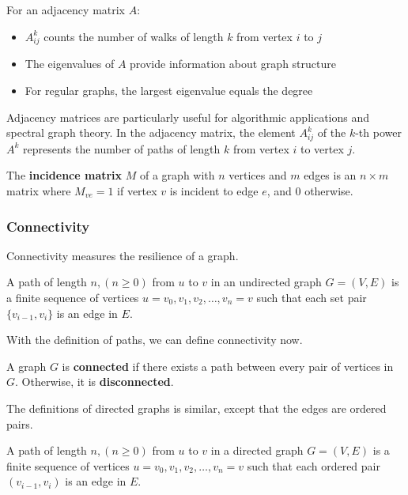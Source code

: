 \begin{theorem}
For an adjacency matrix $A$:
\begin{itemize}
    \item $A^k_{ij}$ counts the number of walks of length $k$ from vertex $i$ to $j$
    \item The eigenvalues of $A$ provide information about graph structure
    \item For regular graphs, the largest eigenvalue equals the degree
\end{itemize}
\end{theorem}

Adjacency matrices are particularly useful for algorithmic applications and spectral graph theory. In the adjacency matrix, the element $A^k_{ij}$ of the $k$-th power $A^k$ represents the number of paths of length $k$ from vertex $i$ to vertex $j$.

\begin{definition}
The \textbf{incidence matrix} $M$ of a graph with $n$ vertices and $m$ edges is an $n \times m$ matrix where $M_{ve} = 1$ if vertex $v$ is incident to edge $e$, and $0$ otherwise.
\end{definition}

\subsubsection{Connectivity}

Connectivity measures the resilience of a graph.

\begin{definition}
A path of length $n,(n \geq 0)$ from $u$ to $v$ in an undirected graph $G=(V,E)$ is a finite sequence of vertices $u = v_0, v_1, v_2, \ldots, v_n = v$ such that each set pair $\{v_{i-1}, v_i\}$ is an edge in $E$.
\end{definition}

With the definition of paths, we can define connectivity now.

\begin{definition}
A graph $G$ is \textbf{connected} if there exists a path between every pair of vertices in $G$. Otherwise, it is \textbf{disconnected}.
\end{definition}

The definitions of directed graphs is similar, except that the edges are ordered pairs.

\begin{definition}
A path of length $n,(n \geq 0)$ from $u$ to $v$ in a directed graph $G=(V,E)$ is a finite sequence of vertices $u = v_0, v_1, v_2, \ldots, v_n = v$ such that each ordered pair $(v_{i-1}, v_i)$ is an edge in $E$.
\end{definition}

